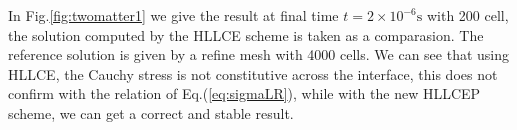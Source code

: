 \documentclass{article}
\numberwithin{equation}{section}
\numberwithin{table}{section}
\begin{document}
In Fig.\ref{fig:twomatter1} we give the result at final time $ t= 2 \times 10^{-6} \text{s}$ with 200 cell, the solution computed by  the HLLCE scheme is taken as a comparasion. The reference solution is given by a refine mesh with 4000 cells. We can see that using HLLCE, the Cauchy stress is not constitutive across the interface, this does not confirm with the relation of Eq.(\ref{eq:sigmaLR}), while with the new HLLCEP scheme, we can get a correct and stable result. 
\begin{figure}
\end{figure}
\end{document}
